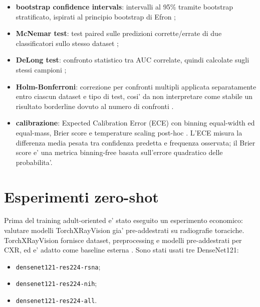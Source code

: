 \documentclass[11pt,a4paper]{article}
\begin{document}
\begin{itemize}
  \item \textbf{bootstrap confidence intervals}: intervalli al 95\% tramite
  bootstrap stratificato, ispirati al principio bootstrap di Efron
  \cite{efron1979bootstrap};
  \item \textbf{McNemar test}: test paired sulle predizioni corrette/errate di
  due classificatori sullo stesso dataset \cite{mcnemar1947};
  \item \textbf{DeLong test}: confronto statistico tra AUC correlate, quindi
  calcolate sugli stessi campioni \cite{delong1988};
  \item \textbf{Holm-Bonferroni}: correzione per confronti multipli applicata
  separatamente entro ciascun dataset e tipo di test, cosi' da non interpretare
  come stabile un risultato borderline dovuto al numero di confronti
  \cite{holm1979}.
  \item \textbf{calibrazione}: Expected Calibration Error (ECE) con binning
  equal-width ed equal-mass, Brier score e temperature scaling post-hoc
  \cite{guo2017calibration}. L'ECE misura la differenza media pesata tra
  confidenza predetta e frequenza osservata; il Brier score e' una metrica
  binning-free basata sull'errore quadratico delle probabilita'.
\end{itemize}

\section{Esperimenti zero-shot}

Prima del training adult-oriented e' stato eseguito un esperimento economico:
valutare modelli TorchXRayVision gia' pre-addestrati su radiografie toraciche.
TorchXRayVision fornisce dataset, preprocessing e modelli pre-addestrati per
CXR, ed e' adatto come baseline esterna \cite{torchxrayvision}. Sono stati
usati tre DenseNet121:

\begin{itemize}
  \item \texttt{densenet121-res224-rsna};
  \item \texttt{densenet121-res224-nih};
  \item \texttt{densenet121-res224-all}.
\end{itemize}
\end{document}
